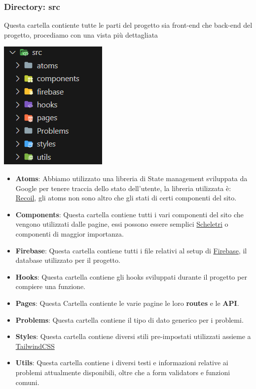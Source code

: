 \documentclass[11pt, a4paper]{article}
\theoremstyle{definition}
\begin{document}
\subsubsection{Directory: src}
Questa cartella contiente tutte le parti del progetto sia front-end che back-end del progetto, procediamo con una vista più dettagliata
\begin{center}
  \includegraphics{materiale/src.png}
\end{center}
\begin{itemize}
  \item \textbf{Atoms}: Abbiamo utilizzato una libreria di State management sviluppata da Google per tenere traccia dello stato dell'utente, la libreria utilizzata è: \href{https://recoiljs.org/}{Recoil}, gli atoms non sono altro che gli stati di certi componenti del sito.
  \item \textbf{Components}: Questa cartella contiene tutti i vari componenti del sito che vengono utilizzati dalle pagine, essi possono essere semplici \href{https://www.nngroup.com/articles/skeleton-screens/}{Scheletri} o componenti di maggior importanza.
  \item \textbf{Firebase}: Questa cartella contiene tutti i file relativi al setup di \href{https://firebase.google.com/}{Firebase}, il database utilizzato per il progetto.
  \item \textbf{Hooks}: Questa cartella contiene gli hooks sviluppati durante il progetto per compiere una funzione.
  \item \textbf{Pages}: Questa Cartella contiente le varie pagine le loro \textbf{routes} e le \textbf{API}.
  \item \textbf{Problems}: Questa cartella contiene il tipo di dato generico per i problemi.
  \item \textbf{Styles}: Questa cartella contiene diversi stili pre-impostati utilizzati assieme a \href{https://tailwindcss.com/}{TailwindCSS}
  \item \textbf{Utils}: Questa cartella contiene i diversi testi e informazioni relative ai problemi attualmente disponibili, oltre che a form validators e funzioni comuni.
\end{itemize}
\end{document}
